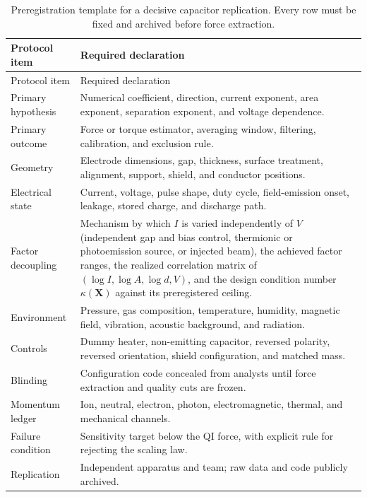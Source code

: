 \documentclass[11pt]{article}
\begin{document}
\begin{longtable}{>{\raggedright\arraybackslash}p{}>{\raggedright\arraybackslash}p{}}
\caption{Preregistration template for a decisive capacitor replication. Every row must be fixed and archived before force extraction.}\label{tab:capacitor_protocol}\\
\toprule
Protocol item & Required declaration \\
\midrule
\endfirsthead
\toprule
Protocol item & Required declaration \\
\midrule
\endhead
Primary hypothesis & Numerical coefficient, direction, current exponent, area exponent, separation exponent, and voltage dependence. \\
Primary outcome & Force or torque estimator, averaging window, filtering, calibration, and exclusion rule. \\
Geometry & Electrode dimensions, gap, thickness, surface treatment, alignment, support, shield, and conductor positions. \\
Electrical state & Current, voltage, pulse shape, duty cycle, field-emission onset, leakage, stored charge, and discharge path. \\
Factor decoupling & Mechanism by which \(I\) is varied independently of \(V\) (independent gap and bias control, thermionic or photoemission source, or injected beam), the achieved factor ranges, the realized correlation matrix of \((\log I,\log A,\log d,V)\), and the design condition number \(\kappa(\mathbf X)\) against its preregistered ceiling. \\
Environment & Pressure, gas composition, temperature, humidity, magnetic field, vibration, acoustic background, and radiation. \\
Controls & Dummy heater, non-emitting capacitor, reversed polarity, reversed orientation, shield configuration, and matched mass. \\
Blinding & Configuration code concealed from analysts until force extraction and quality cuts are frozen. \\
Momentum ledger & Ion, neutral, electron, photon, electromagnetic, thermal, and mechanical channels. \\
Failure condition & Sensitivity target below the QI force, with explicit rule for rejecting the scaling law. \\
Replication & Independent apparatus and team; raw data and code publicly archived. \\
\bottomrule
\end{longtable}
\end{document}
